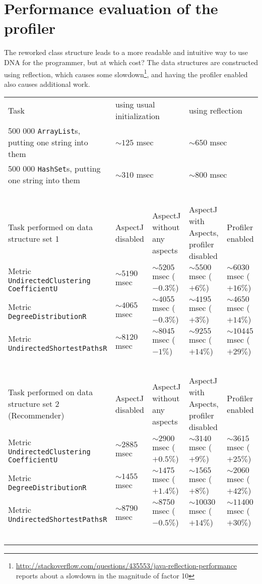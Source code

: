 \section{Performance evaluation of the profiler} \label{sec:performance}
	The reworked class structure leads to a more readable and intuitive way to use DNA for
	the programmer, but at which cost? The data structures are constructed using reflection,
	which causes some
	slowdown\footnote{\url{http://stackoverflow.com/questions/435553/java-reflection-performance}
	reports about a slowdown in the magnitude of factor 10}, and having the profiler
	enabled also causes additional work. 
	
	\begin{sidewaystable}
		\begin{tabular}{lllll}
			Task & \multicolumn{2}{l}{using usual initialization} & \multicolumn{2}{l}{using
			reflection} \\
		    500 000 \texttt{ArrayList}s, putting one string into them & 
		    	\multicolumn{2}{l}{$\sim 125$ msec} & \multicolumn{2}{l}{$\sim 650$ msec} \\
		    500 000 \texttt{HashSet}s, putting one string into them  &
		    	\multicolumn{2}{l}{$\sim 310$ msec} & \multicolumn{2}{l}{$\sim 800$ msec} \\
			~ & \\
			Task performed on data structure set 1 & AspectJ disabled & AspectJ without any
			aspects & AspectJ with Aspects, profiler disabled & Profiler enabled \\
	    	Metric \texttt{Undirected\allowbreak Clustering\allowbreak
				CoefficientU} & $\sim 5190$ msec & $\sim 5205$ msec ($- 0.3\%$) & $\sim 5500$ msec ($+
				6\%$) & $\sim 6030$ msec ($+ 16\%$) \\
			Metric \texttt{Degree\allowbreak DistributionR} &
				$\sim 4065$ msec & $\sim 4055$ msec ($- 0.3\%$) & $\sim 4195$ msec ($+
				3\%$) & $\sim 4650$ msec ($+ 14\%$) \\
			Metric \texttt{Undirected\allowbreak Shortest\allowbreak PathsR} &
				$\sim 8120$ msec & $\sim 8045$ msec ($- 1\%$) & $\sim 9255$ msec ($+
				14\%$) & $\sim 10445$ msec ($+ 29\%$) \\
			~ & \\
			
			Task performed on data structure set 2 (Recommender) & AspectJ disabled & AspectJ
			without any aspects & AspectJ with Aspects, profiler disabled & Profiler enabled \\
	    	Metric \texttt{Undirected\allowbreak Clustering\allowbreak
				CoefficientU} & $\sim 2885$ msec & $\sim 2900$ msec ($+ 0.5\%$) & $\sim 3140$ msec ($+
				9\%$) & $\sim 3615$ msec ($+ 25\%$) \\
			Metric \texttt{Degree\allowbreak DistributionR} &
				$\sim 1455$ msec & $\sim 1475$ msec ($+ 1.4\%$) & $\sim 1565$ msec ($+
				8\%$) & $\sim 2060$ msec ($+ 42\%$) \\
			Metric \texttt{Undirected\allowbreak Shortest\allowbreak PathsR} &
				$\sim 8790$ msec & $\sim 8750$ msec ($- 0.5\%$) & $\sim 10030$ msec ($+
				14\%$) & $\sim 11400$ msec ($+ 30\%$) \\
			~ & \\
			

\end{tabular}
\end{sidewaystable}
